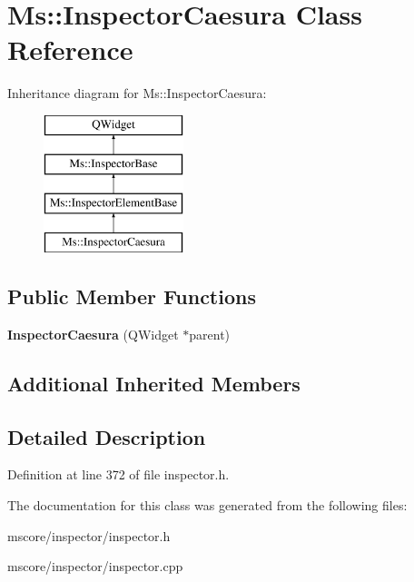 \hypertarget{class_ms_1_1_inspector_caesura}{}\section{Ms\+:\+:Inspector\+Caesura Class Reference}
\label{class_ms_1_1_inspector_caesura}
Inheritance diagram for Ms\+:\+:Inspector\+Caesura\+:\begin{figure}[H]
\begin{center}
\leavevmode
\includegraphics[height=4.000000cm]{class_ms_1_1_inspector_caesura}
\end{center}
\end{figure}
\subsection*{Public Member Functions}
\begin{DoxyCompactItemize}
\item 
\mbox{\label{class_ms_1_1_inspector_caesura_aa0f134d8d3e9e6bfcf83faa1fbb01aa2}} 
{\bfseries Inspector\+Caesura} (Q\+Widget $\ast$parent)
\end{DoxyCompactItemize}
\subsection*{Additional Inherited Members}


\subsection{Detailed Description}


Definition at line 372 of file inspector.\+h.



The documentation for this class was generated from the following files\+:\begin{DoxyCompactItemize}
\item 
mscore/inspector/inspector.\+h\item 
mscore/inspector/inspector.\+cpp\end{DoxyCompactItemize}
